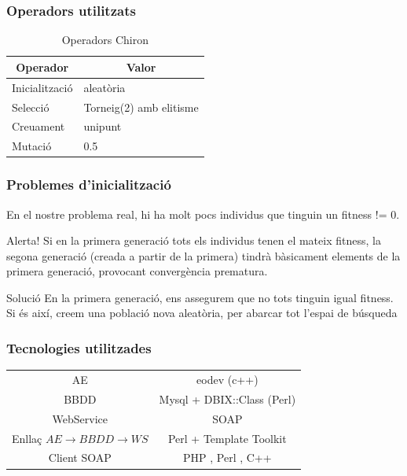 \documentclass{beamer}
\begin{document}
\begin{frame}
\frametitle{Operadors utilitzats}


\begin{table}
\centering
\begin{tabular}{|l|l|}
\hline
\multicolumn{1}{|c|}{\textbf{Operador }} & \multicolumn{1}{c|}{\textbf{ Valor}} \\
\hline
\hline
Inicialització & aleatòria \\
Selecció       &  Torneig(2) amb elitisme       \\
Creuament       & unipunt  \\
Mutació        & 0.5        \\
\hline
\end{tabular}
\caption{Operadors Chiron}
\end{table}
\end{frame}

\begin{frame}
\frametitle{Problemes d'inicialització}
En el nostre problema real, hi ha molt pocs individus que tinguin un fitness !=
0.
\pause
\begin{alertblock}{Alerta!}
Si en la primera generació tots els individus tenen el mateix fitness, la segona
generació (creada a partir de la primera) tindrà bàsicament elements de la
primera generació, provocant convergència prematura.
\end{alertblock}
\pause
\begin{exampleblock}{Solució}
En la primera generació, ens assegurem que no tots tinguin igual fitness.  Si és
així, creem una població nova aleatòria, per abarcar tot l'espai de búsqueda
\end{exampleblock}
\end{frame}

\begin{frame}
\frametitle{Tecnologies utilitzades}
\begin{tabular}[h!]{|c|c|}
AE & eodev (c++) \\
BBDD & Mysql + DBIX::Class (Perl) \\
WebService & SOAP \\
Enllaç $AE\rightarrow BBDD\rightarrow WS$ & Perl + Template Toolkit\\
Client SOAP & PHP , Perl , C++ \\
\end{tabular}
\end{frame}
\end{document}

